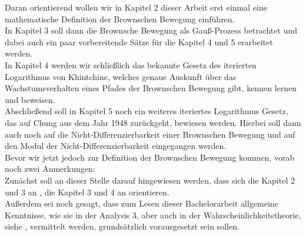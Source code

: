 \documentclass[12pt,a4paper]{scrartcl}
\numberwithin{equation}{section}
\numberwithin{equation}{section}%
\theoremstyle{definition}
\begin{document}
\noindent Daran orientierend wollen wir in Kapitel 2 dieser Arbeit erst einmal eine mathematische Definition der Brownschen Bewegung einführen.\\
In Kapitel 3 soll dann die Brownsche Bewegung als Gauß-Prozess betrachtet und dabei auch ein paar vorbereitende Sätze für die Kapitel 4 und 5 erarbeitet werden.\\
In Kapitel 4 werden wir schließlich das bekannte Gesetz des iterierten Logarithmus von Khintchine, welches genaue Auskunft über das Wachstumsverhalten eines Pfades der Brownschen Bewegung gibt, kennen lernen und beweisen.\\
Abschließend soll in Kapitel 5 noch ein weiteres iteriertes Logarithmus Gesetz, das auf Chung aus dem Jahr 1948 zurückgeht, bewiesen werden. Hierbei soll dann auch noch auf die Nicht-Differenzierbarkeit einer Brownschen Bewegung und auf den Modul der Nicht-Differenzierbarkeit eingegangen werden.
\\
\noindent Bevor wir jetzt jedoch zur Definition der Brownschen Bewegung kommen, vorab noch zwei Anmerkungen:\\
Zunächst soll an dieser Stelle darauf hingewiesen werden, dass sich die Kapitel 2 und 3 an \cite[Kapitel 2]{Schilling}, die Kapitel 3 und 4 an \cite[Kapitel 11]{Schilling} orientieren.\\
Außerdem sei noch gesagt, dass zum Lesen dieser Bachelorarbeit allgemeine Kenntnisse, wie sie in der Analysis 3, aber auch in der Wahrscheinlichkeitstheorie, siehe \cite{Henze Skript}, vermittelt werden, grundsätzlich vorausgesetzt sein sollen. 

\newpage
\end{document}
